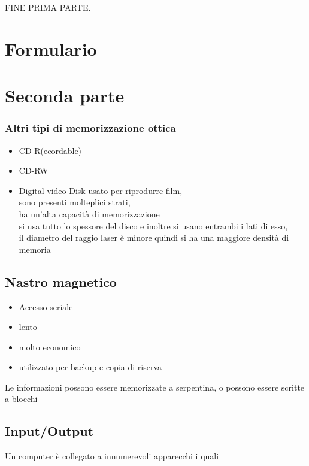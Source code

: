 \documentclass[12pt, a4paper]{article}
\begin{document}
\Huge FINE PRIMA PARTE.
\section{Formulario}


\section{Seconda parte}%
\label{sec:seconda_parte}

\subsubsection{Altri tipi di memorizzazione ottica}%
\label{subsub:altri_tipi_di_memorizzazione_ottica}

\begin{itemize}
	\item CD-R(ecordable)
	\item CD-RW
	\item Digital video Disk
		usato per riprodurre film, \\
		sono presenti molteplici strati,\\
		ha un'alta capacità di memorizzazione\\
		si usa tutto lo spessore del disco e inoltre si usano entrambi i
		lati di esso,\\
		il diametro del raggio laser è minore quindi si ha una maggiore 
		densità di memoria 

\end{itemize}

\subsection{Nastro magnetico}%
\label{sub:nastro_magnetico}

\begin{itemize}
	\item Accesso seriale
	\item lento
	\item molto economico 
	\item utilizzato per backup e copia di riserva
\end{itemize}
Le informazioni possono essere memorizzate a serpentina, o possono essere scritte 
a blocchi


\subsection{Input/Output}%
\label{sub:input_output}
Un computer è collegato a innumerevoli apparecchi i quali
\end{document}
